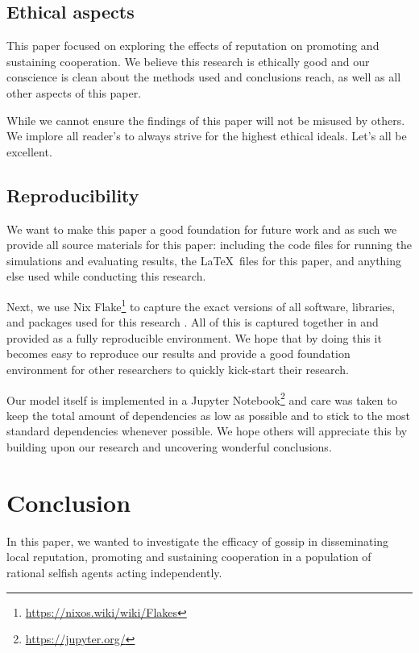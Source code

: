 \documentclass[english]{article}
\begin{document}
\subsection{Ethical aspects}
This paper focused on exploring the effects of reputation on promoting and sustaining cooperation.
We believe this research is ethically good and our conscience is clean about the methods used and conclusions reach, as well as all other aspects of this paper.

While we cannot ensure the findings of this paper will not be misused by others. We implore all reader's to always strive for the highest ethical ideals.
Let's all be excellent.

\subsection{Reproducibility}
We want to make this paper a good foundation for future work and as such we provide all source materials for this paper: including the code files for running the simulations and evaluating results, the \LaTeX\ files for this paper, and anything else used while conducting this research.

Next, we use Nix Flake\footnote{\url{https://nixos.wiki/wiki/Flakes}} to capture the exact versions of all software, libraries, and packages used for this research \citep{nix}. All of this is captured together in and provided as a fully reproducible environment.
We hope that by doing this it becomes easy to reproduce our results and provide a good foundation environment for other researchers to quickly kick-start their research.

Our model itself is implemented in a Jupyter Notebook\footnote{\url{https://jupyter.org/}} and care was taken to keep the total amount of dependencies as low as possible and to stick to the most standard dependencies whenever possible.
We hope others will appreciate this by building upon our research and uncovering wonderful conclusions.



\section{Conclusion}
In this paper, we wanted to investigate the efficacy of gossip in disseminating local reputation, promoting and sustaining cooperation in a population of rational selfish agents acting independently.
\end{document}
